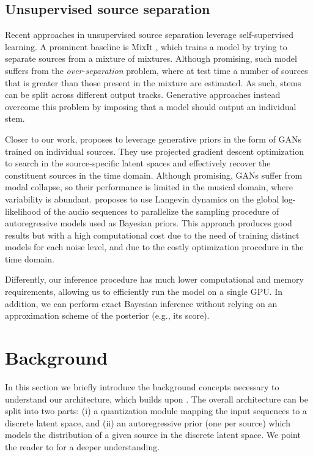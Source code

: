 \documentclass[a4paper]{article}
\begin{document}
\subsection{Unsupervised source separation}

Recent approaches in unsupervised source separation leverage self-supervised learning. A prominent baseline is MixIt \cite{wisdom2020}, which trains a model by trying to separate sources from a mixture of mixtures. Although promising, such model suffers from the \emph{over-separation} problem, where at test time a number of sources that is greater than those present in the mixture are estimated. As such, stems can be split across different output tracks. Generative approaches instead overcome this problem by imposing that a model should output an individual stem.

Closer to our work, \cite{narayanaswamy2020unsupervised} proposes to leverage generative priors in the form of GANs trained on individual sources. They use projected gradient descent optimization to search in the source-specific latent spaces and effectively recover the constituent sources in the time domain. Although promising, GANs suffer from modal collapse, so their performance is limited in the musical domain, where variability is abundant.
\cite{jayaram2021} proposes to use Langevin dynamics on the global log-likelihood of the audio sequences to parallelize the sampling procedure of autoregressive
models used as Bayesian priors. 
This approach produces good results but with a high computational cost due to the need of training distinct models for each noise level, and due to the costly optimization procedure in the time domain.


Differently, our inference procedure has much lower computational and memory requirements, allowing us to efficiently run the model on a single GPU. In addition, we can perform exact Bayesian inference without relying on an approximation scheme of the posterior (e.g., its score).
 \section{Background}

\label{sec:background}
   In this section we briefly introduce the background concepts necessary to understand our architecture, which builds upon  \cite{dhariwal:2020}. The overall architecture can be split into two parts: (i) a quantization module mapping the input sequences to a discrete latent space, and (ii) an autoregressive prior (one per source) which models the distribution of a given source in the discrete latent space. We point the reader to \cite{dhariwal:2020} for a deeper understanding.
\end{document}

